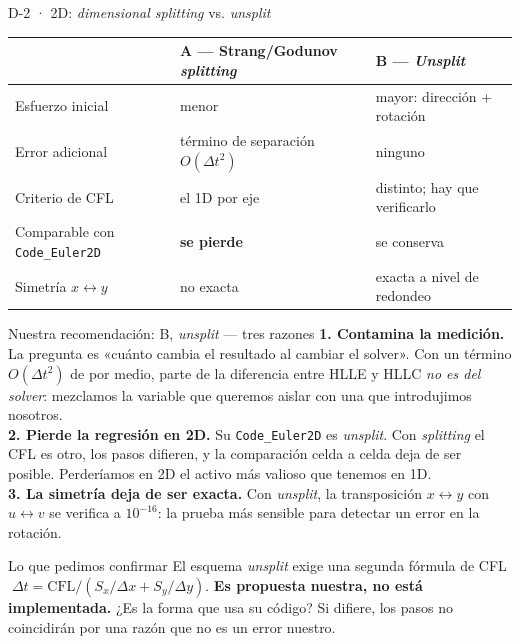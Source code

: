 \documentclass[aspectratio=169,10pt]{beamer}
\newcommand{\cod}[1]{\texttt{\small #1}}
\begin{document}
\begin{frame}[shrink]{D-2 · 2D: \emph{dimensional splitting} vs. \emph{unsplit}}
  \centering\scriptsize
  \begin{tabular}{@{}lll@{}}
    \toprule
    & \textbf{A — Strang/Godunov \emph{splitting}} & \textbf{B — \emph{Unsplit}} \\
    \midrule
    Esfuerzo inicial                 & menor & mayor: dirección + rotación \\
    Error adicional                  & término de separación $O(\Delta t^2)$ & ninguno \\
    Criterio de CFL                  & el 1D por eje & distinto; hay que verificarlo \\
    Comparable con \cod{Code\_Euler2D}& \textbf{se pierde} & se conserva \\
    Simetría $x\leftrightarrow y$     & no exacta & exacta a nivel de redondeo \\
    \bottomrule
  \end{tabular}

  \vspace{0.5em}
  \begin{exampleblock}{Nuestra recomendación: B, \emph{unsplit} — tres razones}
    \scriptsize
    \textbf{1. Contamina la medición.} La pregunta es «cuánto cambia el resultado
    al cambiar el solver». Con un término $O(\Delta t^2)$ de por medio, parte de la
    diferencia entre HLLE y HLLC \emph{no es del solver}: mezclamos la variable
    que queremos aislar con una que introdujimos nosotros.
    \\[2pt]
    \textbf{2. Pierde la regresión en 2D.} Su \cod{Code\_Euler2D} es \emph{unsplit}.
    Con \emph{splitting} el CFL es otro, los pasos difieren, y la comparación
    celda a celda deja de ser posible. Perderíamos en 2D el activo más valioso que
    tenemos en 1D.
    \\[2pt]
    \textbf{3. La simetría deja de ser exacta.} Con \emph{unsplit}, la
    transposición $x\leftrightarrow y$ con $u\leftrightarrow v$ se verifica a
    $10^{-16}$: la prueba más sensible para detectar un error en la rotación.
  \end{exampleblock}

  \begin{alertblock}{Lo que pedimos confirmar}
    \scriptsize
    El esquema \emph{unsplit} exige una segunda fórmula de CFL
    $\;\Delta t = \mathrm{CFL}\big/\left(S_x/\Delta x + S_y/\Delta y\right)$.
    \textbf{Es propuesta nuestra, no está implementada.} ¿Es la forma que usa su
    código? Si difiere, los pasos no coincidirán por una razón que no es un error
    nuestro.
  \end{alertblock}
\end{frame}
\end{document}
